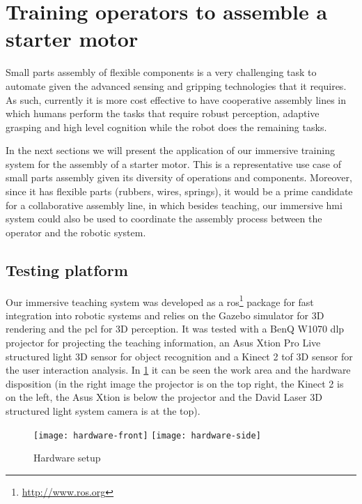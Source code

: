 \section{Training operators to assemble a starter motor}\label{sec:training}

Small parts assembly of flexible components is a very challenging task to automate given the advanced sensing and gripping technologies that it requires. As such, currently it is more cost effective to have cooperative assembly lines in which humans perform the tasks that require robust perception, adaptive grasping and high level cognition while the robot does the remaining tasks.

In the next sections we will present the application of our immersive training system for the assembly of a starter motor. This is a representative use case of small parts assembly given its diversity of operations and components. Moreover, since it has flexible parts (rubbers, wires, springs), it would be a prime candidate for a collaborative assembly line, in which besides teaching, our immersive \gls{hmi} system could also be used to coordinate the assembly process between the operator and the robotic system.



\subsection{Testing platform}

Our immersive teaching system was developed as a \gls{ros}\footnote{\url{http://www.ros.org}} package for fast integration into robotic systems and relies on the Gazebo simulator for 3D rendering and the \gls{pcl} for 3D perception. It was tested with a BenQ W1070 \gls{dlp} projector for projecting the teaching information, an Asus Xtion Pro Live structured light 3D sensor for object recognition and a Kinect 2 \gls{tof} 3D sensor for the user interaction analysis. In \cref{fig:hardware} it can be seen the work area and the hardware disposition (in the right image the projector is on the top right, the Kinect 2 is on the left, the Asus Xtion is below the projector and the David Laser 3D structured light system camera is at the top).

\begin{figure}[ht]
	\centering
	\texttt{[image: hardware-front]}
	\texttt{[image: hardware-side]}
	\caption{Hardware setup}
	\label{fig:hardware}
\end{figure}



